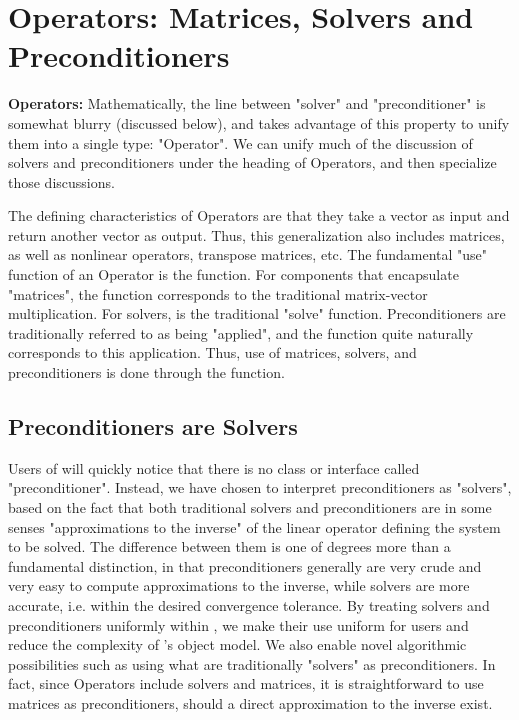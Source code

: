 
\chapter{Operators: Matrices, Solvers and Preconditioners}

{\bf Operators:} Mathematically, the line between "solver" and "preconditioner" is
somewhat blurry (discussed 
below), and \hypre{} takes advantage of this property
to unify them into a single type: "Operator".
We can unify much of 
the discussion of solvers and preconditioners under the heading of Operators,
and then specialize those 
discussions.

The defining characteristics of Operators are that they take a vector as input
and return another vector as 
output. Thus, this generalization also includes matrices, as well as nonlinear
operators, transpose matrices, 
etc. 
The fundamental "use" function of an Operator is the  function. For
components that 
encapsulate "matrices", the  function corresponds to the traditional
matrix-vector multiplication. For 
solvers,  is the traditional "solve" function. 
Preconditioners are traditionally
referred to as being "applied", 
and the  function quite naturally corresponds to this application. 
Thus,
use of matrices, solvers, and 
preconditioners is done through the  function.

\section{Preconditioners are Solvers}

Users of \hypre{} will quickly notice that there is
no class or interface called 
"preconditioner". Instead, we have chosen to interpret preconditioners as
"solvers", based on the fact that 
both traditional solvers and preconditioners are in some senses "approximations
to the inverse" of the linear 
operator defining the system to be solved. The difference between them is one
of degrees more than a fundamental distinction, in that 
preconditioners generally are very crude and very easy to compute
approximations to the inverse, while 
solvers are more accurate, i.e. within the desired convergence tolerance. By
treating solvers and 
preconditioners uniformly within \hypre{}, we make their use uniform for users and
reduce the complexity 
of \hypre{}'s object model. We also enable novel algorithmic possibilities such as
using what are 
traditionally "solvers" as preconditioners. In fact, since Operators include
solvers and matrices, it is 
straightforward to use matrices as preconditioners, should a direct
approximation to the inverse exist. 

